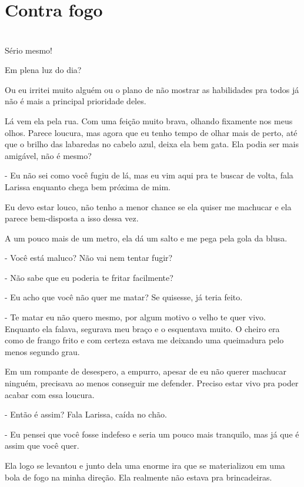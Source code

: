 \newpage


\ifdefined\useChapters
\chapter{Contra fogo}
\else
\chapter{}
\fi

Sério mesmo!

Em plena luz do dia? 

Ou eu irritei muito alguém ou o plano de não mostrar as habilidades pra todos já não é mais a principal prioridade deles.

Lá vem ela pela rua. Com uma feição muito brava, olhando fixamente nos meus olhos. Parece loucura, mas agora que eu tenho tempo de olhar mais de perto, até que o brilho das labaredas no cabelo azul, deixa ela bem gata. Ela podia ser mais amigável, não é mesmo?

- Eu não sei como você fugiu de lá, mas eu vim aqui pra te buscar de volta, fala Larissa enquanto chega bem próxima de mim.

Eu devo estar louco, não tenho a menor chance se ela quiser me machucar e ela parece bem-disposta a isso dessa vez.

A um pouco mais de um metro, ela dá um salto e me pega pela gola da blusa.

- Você está maluco? Não vai nem tentar fugir?

- Não sabe que eu poderia te fritar facilmente?

- Eu acho que você não quer me matar? Se quisesse, já teria feito.

- Te matar eu não quero mesmo, por algum motivo o velho te quer vivo. Enquanto ela falava, segurava meu braço e o esquentava muito. O cheiro era como de frango frito e com certeza estava me deixando uma queimadura pelo menos segundo grau.

Em um rompante de desespero, a empurro, apesar de eu não querer machucar ninguém, precisava ao menos conseguir me defender. Preciso estar vivo pra poder acabar com essa loucura.

- Então é assim? Fala Larissa, caída no chão.

- Eu pensei que você fosse indefeso e seria um pouco mais tranquilo, mas já que é assim que você quer.

Ela logo se levantou e junto dela uma enorme ira que se materializou em uma bola de fogo na minha direção. Ela realmente não estava pra brincadeiras.

